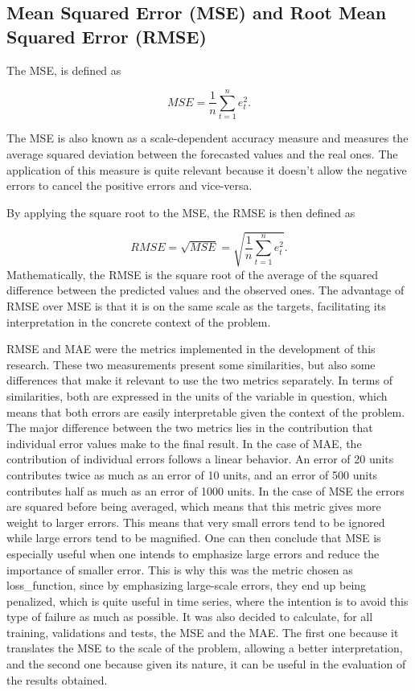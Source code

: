 \subsection{Mean Squared Error (MSE) and Root Mean Squared Error (RMSE)}

The \ac{MSE}, is defined as

\begin{equation}
     MSE =\frac {1}{n}\sum_{t=1}^ne_t^2.
\label{mse}
\end{equation}

The \ac{MSE} is also known as a scale-dependent accuracy measure and measures the average squared deviation between the forecasted values and the real ones. The application of this measure is quite relevant because it doesn't allow the negative errors to cancel the positive errors and vice-versa. 

By applying the square root to the \ac{MSE}, the \ac{RMSE} is then defined as

\begin{equation}
     RMSE =\sqrt{MSE} = \sqrt{\frac {1}{n}\sum_{t=1}^ne_t^2}.
\label{rmse}
\end{equation}
Mathematically, the \ac{RMSE} is the square root of the average of the squared difference between the predicted values and the observed ones. The advantage of \ac{RMSE} over \ac{MSE} is that it is on the same scale as the targets, facilitating its interpretation in the concrete context of the problem. 

\ac{RMSE} and \ac{MAE} were the metrics implemented in the development of this research. These two measurements present some similarities, but also some differences that make it relevant to use the two metrics separately. In terms of similarities, both are expressed in the units of the variable in question, which means that both errors are easily interpretable given the context of the problem. The major difference between the two metrics lies in the contribution that individual error values make to the final result. In the case of \ac{MAE}, the contribution of individual errors follows a linear behavior. An error of 20 units contributes twice as much as an error of 10 units, and an error of 500 units contributes half as much as an error of 1000 units. In the case of \ac{MSE} the errors are squared before being averaged, which means that this metric gives more weight to larger errors.  This means that very small errors tend to be ignored while large errors tend to be magnified. One can then conclude that \ac{MSE} is especially useful when one intends to emphasize large errors and reduce the importance of smaller error. This is why this was the metric chosen as loss\_function, since by emphasizing large-scale errors, they end up being penalized, which is quite useful in time series, where the intention is to avoid this type of failure as much as possible. It was also decided to calculate, for all training, validations and tests, the \ac{MSE} and the \ac{MAE}. The first one because it translates the \ac{MSE} to the scale of the problem, allowing a better interpretation, and the second one because given its nature, it can be useful in the evaluation of the results obtained.

